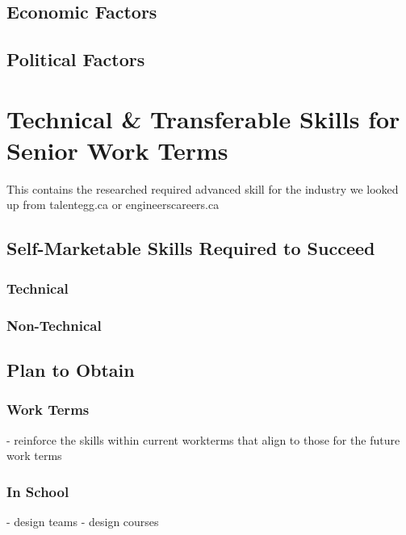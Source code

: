 \documentclass[10pt,letterpaper]{article}
\begin{document}
\subsection{Economic Factors}

\subsection{Political Factors}


\clearpage
\section{Technical \& Transferable Skills for Senior Work Terms}\label{transferable-skills}




This contains the researched required advanced skill for the industry we looked up from talentegg.ca or engineerscareers.ca

\subsection{Self-Marketable Skills Required to Succeed}
\subsubsection{Technical}

\subsubsection{Non-Technical}

\subsection{Plan to Obtain}

\subsubsection{Work Terms}
- reinforce the skills within current workterms that align to those for the future work terms

\subsubsection{In School}
- design teams
- design courses
\end{document}
